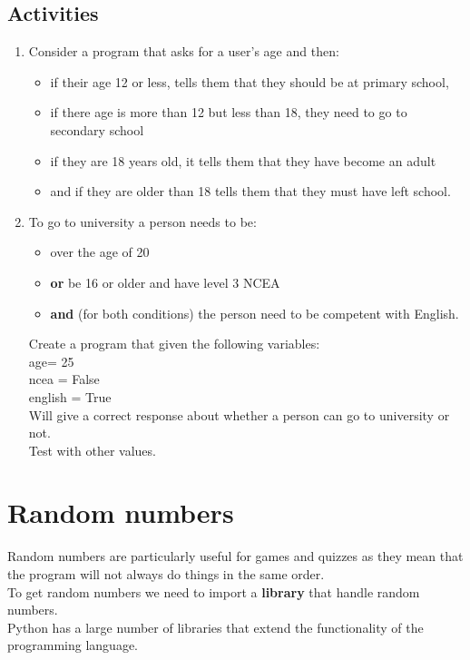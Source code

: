 \documentclass[a4paper,12pt]{article}
\begin{document}
\subsection{Activities}
\begin{enumerate}
	\item Consider a program that asks for a user’s age and then:
\begin{itemize}
	\item if their age 12 or less, tells them that they should be at primary school,
	\item if there age is more than 12 but less than 18, they need to go to secondary school
	\item if they are 18 years old, it tells them that they have become an adult
	\item and if they are older than 18 tells them that they must have left school.
\end{itemize}
\item 	To go to university a person needs to be:
\begin{itemize}
	\item over the age of 20
	\item \textbf{or} be 16 or older and have level 3 NCEA 
	\item \textbf{and} (for both conditions) the person need to be competent with English.
\end{itemize} 
Create a program that given the following variables:\\
age= 25\\
ncea = False\\
english = True\\
Will give a correct response about whether a person can go to university or not.\\
Test with other values.
\end{enumerate}

\newpage
\section{Random numbers}
Random numbers are particularly useful for games and quizzes as they mean that the program will not always do things in the same order.\\
To get random numbers we need to import a \textbf{library} that handle random numbers.\\
Python has a large number of libraries that extend the functionality of the programming language.


\newpage
\end{document}
